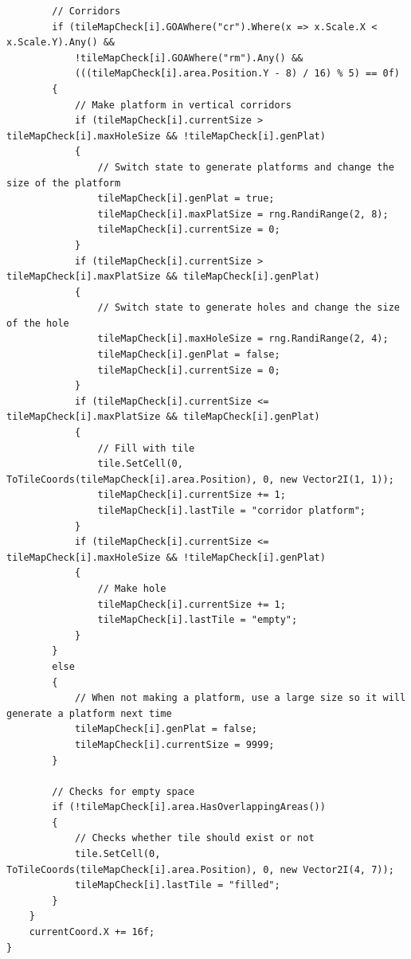 \documentclass{article}
\begin{document}
\begin{lstlisting}
        // Corridors
        if (tileMapCheck[i].GOAWhere("cr").Where(x => x.Scale.X < x.Scale.Y).Any() &&
            !tileMapCheck[i].GOAWhere("rm").Any() &&
            (((tileMapCheck[i].area.Position.Y - 8) / 16) % 5) == 0f)
        {
            // Make platform in vertical corridors
            if (tileMapCheck[i].currentSize > tileMapCheck[i].maxHoleSize && !tileMapCheck[i].genPlat)
            {
                // Switch state to generate platforms and change the size of the platform
                tileMapCheck[i].genPlat = true;
                tileMapCheck[i].maxPlatSize = rng.RandiRange(2, 8);
                tileMapCheck[i].currentSize = 0;
            }
            if (tileMapCheck[i].currentSize > tileMapCheck[i].maxPlatSize && tileMapCheck[i].genPlat)
            {
                // Switch state to generate holes and change the size of the hole
                tileMapCheck[i].maxHoleSize = rng.RandiRange(2, 4);
                tileMapCheck[i].genPlat = false;
                tileMapCheck[i].currentSize = 0;
            }
            if (tileMapCheck[i].currentSize <= tileMapCheck[i].maxPlatSize && tileMapCheck[i].genPlat)
            {
                // Fill with tile
                tile.SetCell(0, ToTileCoords(tileMapCheck[i].area.Position), 0, new Vector2I(1, 1));
                tileMapCheck[i].currentSize += 1;
                tileMapCheck[i].lastTile = "corridor platform";
            }
            if (tileMapCheck[i].currentSize <= tileMapCheck[i].maxHoleSize && !tileMapCheck[i].genPlat)
            {
                // Make hole
                tileMapCheck[i].currentSize += 1;
                tileMapCheck[i].lastTile = "empty";
            }
        }
        else
        {
            // When not making a platform, use a large size so it will generate a platform next time
            tileMapCheck[i].genPlat = false;
            tileMapCheck[i].currentSize = 9999;
        }

        // Checks for empty space
        if (!tileMapCheck[i].area.HasOverlappingAreas())
        {
            // Checks whether tile should exist or not
            tile.SetCell(0, ToTileCoords(tileMapCheck[i].area.Position), 0, new Vector2I(4, 7));
            tileMapCheck[i].lastTile = "filled";
        }
    }
    currentCoord.X += 16f;
}
\end{lstlisting}
\end{document}

